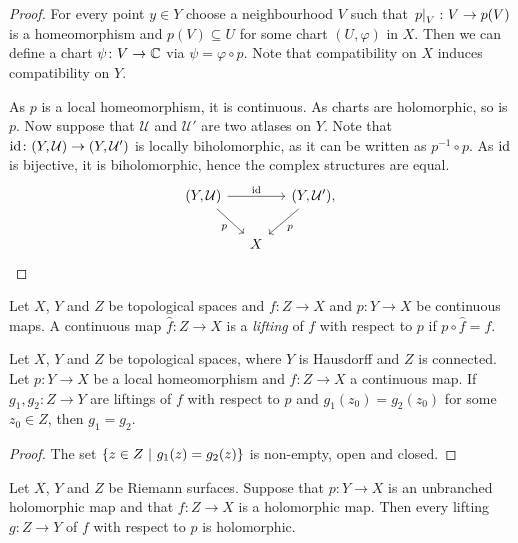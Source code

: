 \begin{proof}
For every point $y \in Y$ choose a neighbourhood $V$ such that
$\left. p\right|_{V}^{} \colon V \to p(V)$ is a homeomorphism and
$p(V) \subseteq U$ for some chart $(U, \varphi)$ in $X$. Then we
can define a chart $\psi \colon V \to \mathbb{C}$ via
$\psi = \varphi \circ p$. Note that compatibility on $X$ induces
compatibility on $Y$.

As $p$ is a local homeomorphism, it is continuous. As charts are
holomorphic, so is $p$. Now suppose that $\mathcal{U}$ and
$\mathcal{U}'$ are two atlases on $Y$.
Note that $\operatorname{id} \colon (Y, \mathcal{U}) \to (Y, \mathcal{U}')$ is
locally biholomorphic, as it can be written as $p^{-1} \circ p$.
As $\operatorname{id}$ is bijective, it is biholomorphic, hence the complex
structures are equal.
\[
\begin{tikzcd}[column sep=small]
(Y, \mathcal{U}) \arrow[rr, "\id"] \arrow[dr, "p"'] &&
(Y, \mathcal{U}'), \arrow[dl, "p"] \\ &
X
\end{tikzcd} \qedhere
\]
\end{proof}

\begin{definicija}
Let $X$, $Y$ and $Z$ be topological spaces and $f \colon Z \to X$
and $p \colon Y \to X$ be continuous maps. A continuous map
$\hat{f} \colon Z \to X$ is a \emph{lifting} of $f$
with respect to $p$ if $p \circ \hat{f} = f$.
\end{definicija}

\begin{izrek}
Let $X$, $Y$ and $Z$ be topological spaces, where $Y$ is Hausdorff
and $Z$ is connected. Let $p \colon Y \to X$ be a local
homeomorphism and $f \colon Z \to X$ a continuous map. If
$g_1, g_2 \colon Z \to Y$ are liftings of $f$ with respect to $p$
and $g_1(z_0) = g_2(z_0)$ for some $z_0 \in Z$, then $g_1 = g_2$.
\end{izrek}

\begin{proof}
The set $\left\{z \in Z~\middle\vert~g_1(z) = g_2(z)\right\}$ is non-empty, open and
closed.
\end{proof}

\begin{izrek}
Let $X$, $Y$ and $Z$ be Riemann surfaces. Suppose that
$p \colon Y \to X$ is an unbranched holomorphic map and that
$f \colon Z \to X$ is a holomorphic map. Then every lifting
$g \colon Z \to Y$ of $f$ with respect to $p$ is holomorphic.
\end{izrek}

